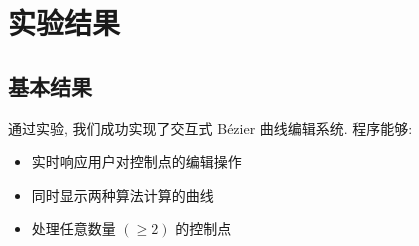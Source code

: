 \documentclass[12pt,a4paper]{report}
\begin{document}
    \chapter{实验结果}
        \section{基本结果}
            通过实验, 我们成功实现了交互式 Bézier 曲线编辑系统. 程序能够:
            \begin{itemize}
                \item 实时响应用户对控制点的编辑操作
                \item 同时显示两种算法计算的曲线
                \item 处理任意数量 $\left(\geq2\right)$ 的控制点
            \end{itemize}
\end{document}
